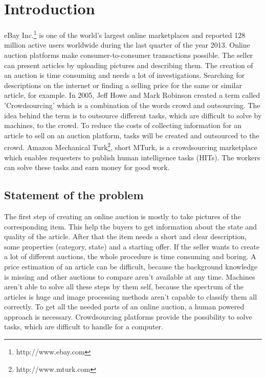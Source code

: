 \documentclass[a4paper]{report}
\begin{document}
  





\pagestyle{plain}
\newpage





\dominitoc
\tableofcontents
\newpage

\listoffigures

\listoftables

\lstlistoflistings

\chapter{Introduction}
eBay Inc.\footnote{http://www.ebay.com} is one of the world's largest online marketplaces and reported 128 million active users worldwide during the last quarter of the year 2013. Online auction platforms make consumer-to-consumer transactions possible. The seller can present articles by uploading pictures and describing them. The creation of an auction is time consuming and needs a lot of investigations. Searching for descriptions on the internet or finding a selling price for the same or similar article, for example. In 2005, Jeff Howe and Mark Robinson created a term called 'Crowdsourcing' which is a combination of the words crowd and outsourcing. The idea behind the term is to outsource different tasks, which are difficult to solve by machines, to the crowd. To reduce the costs of collecting information for an article to sell on an auction platform, tasks will be created and outsourced to the crowd. Amazon Mechanical Turk\footnote{http://www.mturk.com}, short MTurk, is a crowdsourcing marketplace which enables requesters to publish human intelligence tasks (HITs). The workers can solve these tasks and earn money for good work.

\section{Statement of the problem}
The first step of creating an online auction is mostly to take pictures of the corresponding item. This help the buyers to get information about the state and quality of the article. After that the item needs a short and clear description, some properties (category, state) and a starting offer. If the seller wants to create a lot of different auctions, the whole procedure is time consuming and boring. A price estimation of an article can be difficult, because the background knowledge is missing and other auctions to compare aren't available at any time. Machines aren't able to solve all these steps by them self, because the spectrum of the articles is huge and image processing methods aren't capable to classify them all correctly. To get all the needed parts of an online auction, a human powered approach is necessary. Crowdsourcing platforms provide the possibility to solve tasks, which are difficult to handle for a computer.
\end{document}

